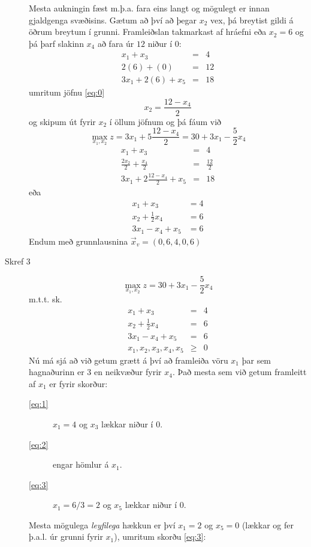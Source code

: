 \begin{lausn}
\begin{description}
Mesta aukningin fæst m.þ.a. fara eins langt og mögulegt er innan gjaldgenga svæðisins. Gætum að því að þegar $x_2$ vex, þá breytist gildi á öðrum breytum í grunni. Framleiðslan takmarkast af hráefni eða $x_2=6$ og þá þarf slakinn $x_4$ að fara úr $12$ niður í $0$:
\begin{eqnarray}
 x_1 + x_3 & = &4 \nonumber\\
 2 (6) + (0) & = &12 \label{eq:0}\\
 3x_1 + 2 (6) + x_5 & = &18 \nonumber 
\end{eqnarray}
umritum jöfnu \eqref{eq:0}
$$x_2 = \frac{12 - x_4 }{2}$$
og skipum út fyrir $x_2$ í öllum jöfnum og þá fáum við
$$\max_{x_1,x_2}  z = 3x_1 + 5 \frac{12 - x_4}{2} = 30 + 3x_1-\frac{5}{2} x_4$$
\begin{eqnarray*}
 x_1 + x_3 & = &4 \\
 \frac{2 x_2}{2} + \frac{x_4}{2} & = & \frac{12}{2} \\
 3x_1 + 2 \frac{12 - x_4 }{2} + x_5 & =&  18 
\end{eqnarray*}
eða
\begin{eqnarray*}
 x_1 + x_3 & = 4 \\
 x_2 + \frac{1}{2}x_4 & = 6\\
3 x_1-x_4+x_5 &= 6
\end{eqnarray*}
Endum með grunnlausnina $\vec{x}_v=(0,6,4,0,6)$
\item[Skref 3] 
$$\max_{x_1,x_2}  z =  30 + 3x_1-\frac{5}{2} x_4$$
m.t.t. sk.
\begin{eqnarray}
 x_1 + x_3 & = &4 \label{eq:1}\\
 x_2 + \frac{1}{2}x_4 & = &6 \label{eq:2}\\
 3x_1 -x_4 +x_5 & = &6 \label{eq:3}\\
 x_1, x_2, x_3, x_4, x_5 &\ge& 0 \nonumber
\end{eqnarray}
Nú má sjá að við getum grætt á því að framleiða vöru $x_1$
þar sem hagnaðurinn er $3$ en neikvæður fyrir $x_4$. Það mesta
sem við getum framleitt af $x_1$ er fyrir skorður:
\begin{description}
\item[\eqref{eq:1}] $x_1=4$ og $x_3$ lækkar niður í $0$.
\item[\eqref{eq:2}] engar hömlur á $x_1$.
\item[\eqref{eq:3}] $x_1=6/3=2$ og $x_5$ lækkar niður í $0$.
\end{description}
Mesta mögulega \emph{leyfilega} hækkun er því $x_1=2$ og $x_5=0$ (lækkar og fer þ.a.l. úr grunni fyrir $x_1$),
umritum skorðu \eqref{eq:3}:

\end{description}
\end{lausn}
